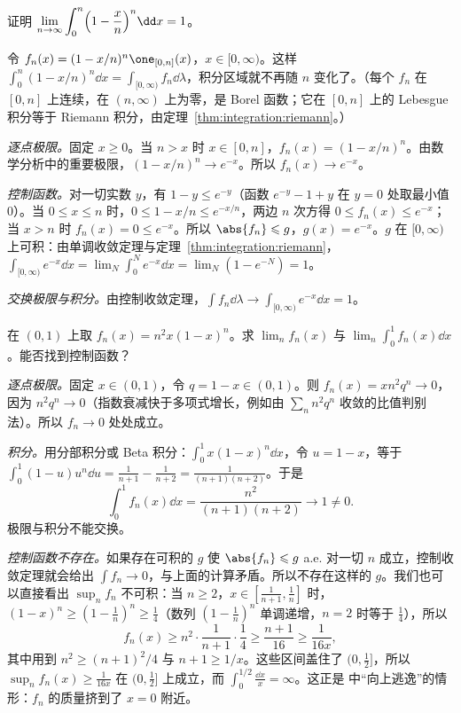 \begin{workedexample}\label{we:integration:exp-limit}
证明 $\displaystyle\lim_{n\to\infty}\int_0^n\Bigl(1-\frac xn\Bigr)^n\dd x=1$。
\end{workedexample}
\begin{solution}
令 $f_n(x)=(1-x/n)^n\one_{[0,n]}(x)$，$x\in[0,\infty)$。这样 $\int_0^n(1-x/n)^n\dd x=\int_{[0,\infty)}f_n\dd\lambda$，积分区域就不再随 $n$ 变化了。（每个 $f_n$ 在 $[0,n]$ 上连续，在 $(n,\infty)$ 上为零，是 Borel 函数；它在 $[0,n]$ 上的 Lebesgue 积分等于 Riemann 积分，由定理~\ref{thm:integration:riemann}。）

\emph{逐点极限。}固定 $x\geqslant0$。当 $n>x$ 时 $x\in[0,n]$，$f_n(x)=(1-x/n)^n$。由数学分析中的重要极限，$(1-x/n)^n\to e^{-x}$。所以 $f_n(x)\to e^{-x}$。

\emph{控制函数。}对一切实数 $y$，有 $1-y\leqslant e^{-y}$（函数 $e^{-y}-1+y$ 在 $y=0$ 处取最小值 $0$）。当 $0\leqslant x\leqslant n$ 时，$0\leqslant1-x/n\leqslant e^{-x/n}$，两边 $n$ 次方得 $0\leqslant f_n(x)\leqslant e^{-x}$；当 $x>n$ 时 $f_n(x)=0\leqslant e^{-x}$。所以 $\abs{f_n}\leqslant g$，$g(x)=e^{-x}$。$g$ 在 $[0,\infty)$ 上可积：由单调收敛定理与定理~\ref{thm:integration:riemann}，$\int_{[0,\infty)}e^{-x}\dd x=\lim_{N}\int_0^Ne^{-x}\dd x=\lim_N(1-e^{-N})=1$。

\emph{交换极限与积分。}由控制收敛定理，$\int f_n\dd\lambda\to\int_{[0,\infty)}e^{-x}\dd x=1$。
\end{solution}

\begin{workedexample}\label{we:integration:dct-fails}
在 $(0,1)$ 上取 $f_n(x)=n^2x(1-x)^n$。求 $\lim_nf_n(x)$ 与 $\lim_n\int_0^1f_n(x)\dd x$。能否找到控制函数？
\end{workedexample}
\begin{solution}
\emph{逐点极限。}固定 $x\in(0,1)$，令 $q=1-x\in(0,1)$。则 $f_n(x)=xn^2q^n\to0$，因为 $n^2q^n\to0$（指数衰减快于多项式增长，例如由 $\sum_nn^2q^n$ 收敛的比值判别法）。所以 $f_n\to0$ 处处成立。

\emph{积分。}用分部积分或 Beta 积分：$\int_0^1x(1-x)^n\dd x$，令 $u=1-x$，等于 $\int_0^1(1-u)u^n\dd u=\frac1{n+1}-\frac1{n+2}=\frac1{(n+1)(n+2)}$。于是
\[
\int_0^1f_n(x)\dd x=\frac{n^2}{(n+1)(n+2)}\to1\neq0 .
\]
极限与积分不能交换。

\emph{控制函数不存在。}如果存在可积的 $g$ 使 $\abs{f_n}\leqslant g$ a.e. 对一切 $n$ 成立，控制收敛定理就会给出 $\int f_n\to0$，与上面的计算矛盾。所以不存在这样的 $g$。我们也可以直接看出 $\sup_nf_n$ 不可积：当 $n\geqslant2$，$x\in[\frac1{n+1},\frac1n]$ 时，$(1-x)^n\geqslant(1-\frac1n)^n\geqslant\frac14$（数列 $(1-\frac1n)^n$ 单调递增，$n=2$ 时等于 $\frac14$），所以
\[
f_n(x)\geqslant n^2\cdot\frac1{n+1}\cdot\frac14\geqslant\frac{n+1}{16}\geqslant\frac1{16x},
\]
其中用到 $n^2\geqslant(n+1)^2/4$ 与 $n+1\geqslant1/x$。这些区间盖住了 $(0,\frac12]$，所以 $\sup_nf_n(x)\geqslant\frac1{16x}$ 在 $(0,\frac12]$ 上成立，而 $\int_0^{1/2}\frac{\dd x}x=\infty$。这正是 中“向上逃逸”的情形：$f_n$ 的质量挤到了 $x=0$ 附近。
\end{solution}

